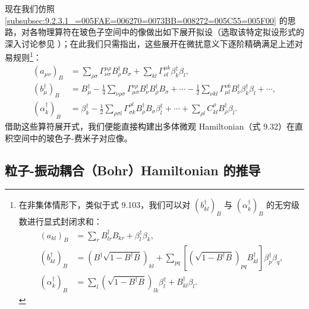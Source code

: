 现在我们仿照 \ref{subsubsec:9.2.3.1_=005FAE=006270=0073BB=008272=005C55=005F00}
的思路，对各物理算符在玻色子空间中的像做出如下展开拟设（选取该特定拟设形式的深入讨论参见 \cite{Ma74}）；在此我们只需指出，这些展开在微扰意义下逐阶精确满足上述对易规则\footnote{在非集体情形下，类似于式 9.103，我们可以对 $(b^{\dagger}_{kl})_{B}$ 与 $(\alpha^{\dagger}_{k})_{B}$
的无穷级数进行显式封闭求和：
\begin{align*}
(a_{kl})_{B} & =\sum_{r}B^{\dagger}_{lr}B_{kr}+\beta^{\dagger}_{l}\beta_{k},\\
(b^{\dagger}_{kl})_{B} & =\left(B^{\dagger}\sqrt{1-B^{\dagger}B}\right)_{kl}+\sum_{pq}\left[\left(\sqrt{1-B^{\dagger}B}\right)_{pq}B^{\dagger}_{kl}\right]\beta^{\dagger}_{p}\beta_{q},\\
(\alpha^{\dagger}_{k})_{B} & =\sum_{l}\left(\sqrt{1-B^{\dagger}B}\right)_{lk}\beta^{\dagger}_{l}+B^{\dagger}_{kl}\beta_{l}.
\end{align*}
}：
\begin{align}
(a_{\mu\nu})_{B} & =\sum_{\rho\sigma}\Gamma^{\mu\rho}_{\nu\sigma}B^{\dagger}_{\rho}B_{\sigma}+\sum_{kl}\Gamma^{\mu k}_{\nu l}\beta^{\dagger}_{k}\beta_{l},\nonumber \\
(b^{\dagger}_{\mu})_{B} & =B^{\dagger}_{\mu}-\frac{1}{4}\sum_{\nu\rho\sigma}\Gamma^{\nu\rho}_{\mu\sigma}B^{\dagger}_{\nu}B^{\dagger}_{\rho}B_{\sigma}+\cdots-\frac{1}{2}\sum_{\nu kl}\Gamma^{\nu k}_{\mu l}B^{\dagger}_{\nu}\beta^{\dagger}_{k}\beta_{l}+\cdots,\label{eq:9.130}\\
(\alpha^{\dagger}_{k})_{B} & =\beta^{\dagger}_{k}-\frac{1}{2}\sum_{\rho\sigma l}\Gamma^{\rho l}_{\sigma k}B^{\dagger}_{\rho}B_{\sigma}\beta^{\dagger}_{l}+\cdots+\sum_{\rho l}C^{\rho}_{kl}B^{\dagger}_{\rho}\beta_{l}.\nonumber 
\end{align}
借助这些算符展开式，我们便能直接构建出多体微观 Hamiltonian（式 9.32）在直积空间中的玻色子-费米子对应像。

\subsection{粒子-振动耦合（Bohr）Hamiltonian 的推导\label{subsec:9.3.2_=007C92=005B50-=00632F=0052A8=008026=005408Hamiltonian=007684=0063A8=005BFC}}

